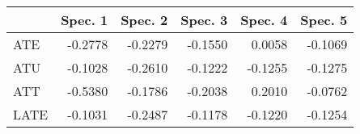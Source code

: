 
\begin{tabular}{lrrrrr}
\toprule
  & Spec. 1 & Spec. 2 & Spec. 3 & Spec. 4 & Spec. 5\\
\midrule
ATE & -0.2778 & -0.2279 & -0.1550 & 0.0058 & -0.1069\\
ATU & -0.1028 & -0.2610 & -0.1222 & -0.1255 & -0.1275\\
ATT & -0.5380 & -0.1786 & -0.2038 & 0.2010 & -0.0762\\
LATE & -0.1031 & -0.2487 & -0.1178 & -0.1220 & -0.1254\\
\bottomrule
\end{tabular}
